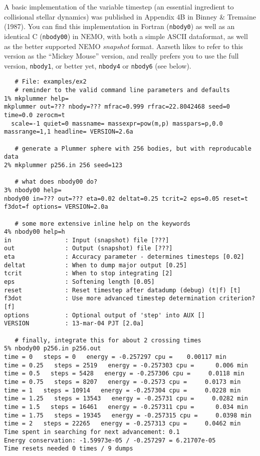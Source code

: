 A basic implementation of the variable timestep (an essential ingredient
to collisional stellar dynamics) was published in Appendix 4B in
Binney \& Tremaine (1987). 
You can find this implementation in Fortran ({\tt nbody0})
as well as an identical C
({\tt nbody00}) in NEMO, with both a simple ASCII dataformat,
as well as the better supported NEMO {\it snapshot} format. Aarseth likes
to refer to this version as the ``Mickey Mouse'' version, and really prefers
you to use the full version, {\tt nbody1}, or better yet,
{\tt nbody4} or {\tt nbody6} (see below).


\footnotesize\begin{verbatim}
   # File: examples/ex2
   # reminder to the valid command line parameters and defaults
1% mkplummer help=
mkplummer out=??? nbody=??? mfrac=0.999 rfrac=22.8042468 seed=0 time=0.0 zerocm=t 
  scale=-1 quiet=0 massname= massexpr=pow(m,p) masspars=p,0.0 massrange=1,1 headline= VERSION=2.6a

   # generate a Plummer sphere with 256 bodies, but with reproducable data
2% mkplummer p256.in 256 seed=123

   # what does nbody00 do?
3% nbody00 help=
nbody00 in=??? out=??? eta=0.02 deltat=0.25 tcrit=2 eps=0.05 reset=t f3dot=f options= VERSION=2.0a

   # some more extensive inline help on the keywords
4% nbody00 help=h
in               : Input (snapshot) file [???]
out              : Output (snapshot) file [???]
eta              : Accuracy parameter - determines timesteps [0.02]
deltat           : When to dump major output [0.25]
tcrit            : When to stop integrating [2]
eps              : Softening length [0.05]
reset            : Reset timestep after datadump (debug) (t|f) [t]
f3dot            : Use more advanced timestep determination criterion? [f]
options          : Optional output of 'step' into AUX []
VERSION          : 13-mar-04 PJT [2.0a]

   # finally, integrate this for about 2 crossing times
5% nbody00 p256.in p256.out
time = 0   steps = 0   energy = -0.257297 cpu =    0.00117 min
time = 0.25   steps = 2519   energy = -0.257303 cpu =      0.006 min
time = 0.5   steps = 5428   energy = -0.257306 cpu =     0.0118 min
time = 0.75   steps = 8207   energy = -0.2573 cpu =     0.0173 min
time = 1   steps = 10914   energy = -0.257304 cpu =     0.0228 min
time = 1.25   steps = 13543   energy = -0.25731 cpu =     0.0282 min
time = 1.5   steps = 16461   energy = -0.257311 cpu =      0.034 min
time = 1.75   steps = 19345   energy = -0.257315 cpu =     0.0398 min
time = 2   steps = 22265   energy = -0.257313 cpu =     0.0462 min
Time spent in searching for next advancement: 0.1
Energy conservation: -1.59973e-05 / -0.257297 = 6.21707e-05
Time resets needed 0 times / 9 dumps


\end{verbatim}\normalsize

